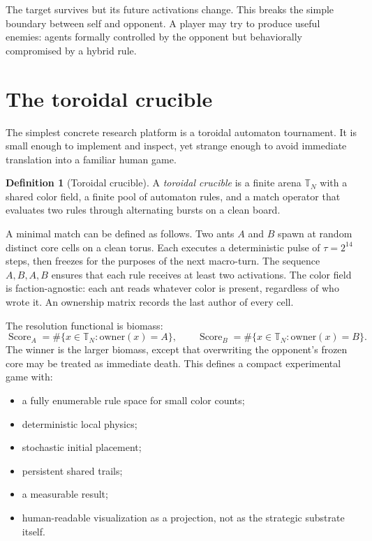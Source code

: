 \documentclass[11pt,a4paper]{article}
\theoremstyle{plain}
\theoremstyle{definition}
\newtheorem{definition}[theorem]{Definition}
\newcommand{\T}{\mathbb{T}}
\DeclareMathOperator{\Score}{Score}
\begin{document}
The target survives but its future activations change. This breaks the simple boundary between self and opponent. A player may try to produce useful enemies: agents formally controlled by the opponent but behaviorally compromised by a hybrid rule.

\section{The toroidal crucible}\label{sec:crucible}

The simplest concrete research platform is a toroidal automaton tournament. It is small enough to implement and inspect, yet strange enough to avoid immediate translation into a familiar human game.

\begin{definition}[Toroidal crucible]\label{def:crucible}
A \emph{toroidal crucible} is a finite arena $\T_N$ with a shared color field, a finite pool of automaton rules, and a match operator that evaluates two rules through alternating bursts on a clean board.
\end{definition}

A minimal match can be defined as follows. Two ants $A$ and $B$ spawn at random distinct core cells on a clean torus. Each executes a deterministic pulse of $\tau=2^{14}$ steps, then freezes for the purposes of the next macro-turn. The sequence $A,B,A,B$ ensures that each rule receives at least two activations. The color field is faction-agnostic: each ant reads whatever color is present, regardless of who wrote it. An ownership matrix records the last author of every cell.

The resolution functional is biomass:
\[
  \Score_A=\#\{x\in\T_N:\mathrm{owner}(x)=A\},\qquad
  \Score_B=\#\{x\in\T_N:\mathrm{owner}(x)=B\}.
\]
The winner is the larger biomass, except that overwriting the opponent's frozen core may be treated as immediate death. This defines a compact experimental game with:
\begin{itemize}
  \item a fully enumerable rule space for small color counts;
  \item deterministic local physics;
  \item stochastic initial placement;
  \item persistent shared trails;
  \item a measurable result;
  \item human-readable visualization as a projection, not as the strategic substrate itself.
\end{itemize}
\end{document}
